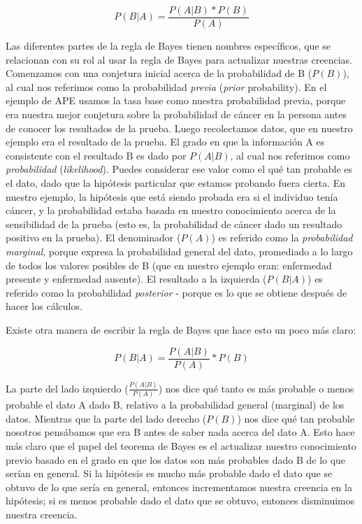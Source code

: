 \documentclass[
  12pt,
]{book}
\begin{document}
\[
P(B|A) =  \frac{P(A|B)*P(B)}{P(A)}
\]

Las diferentes partes de la regla de Bayes tienen nombres específicos, que se relacionan con su rol al usar la regla de Bayes para actualizar nuestras creencias. Comenzamos con una conjetura inicial acerca de la probabilidad de B (\(P(B)\)), al cual nos referimos como la probabilidad \emph{previa} (\emph{prior} probability). En el ejemplo de APE usamos la tasa base como nuestra probabilidad previa, porque era nuestra mejor conjetura sobre la probabilidad de cáncer en la persona antes de conocer los resultados de la prueba. Luego recolectamos datos, que en nuestro ejemplo era el resultado de la prueba. El grado en que la información A es consistente con el resultado B es dado por \(P(A|B)\), al cual nos referimos como \emph{probabilidad} (\emph{likelihood}). Puedes considerar ese valor como el qué tan probable es el dato, dado que la hipótesis particular que estamos probando fuera cierta. En nuestro ejemplo, la hipótesis que está siendo probada era si el individuo tenía cáncer, y la probabilidad estaba basada en nuestro conocimiento acerca de la sensibilidad de la prueba (esto es, la probabilidad de cáncer dado un resultado positivo en la prueba). El denominador (\(P(A)\)) es referido como la \emph{probabilidad marginal}, porque expresa la probabilidad general del dato, promediado a lo largo de todos los valores posibles de B (que en nuestro ejemplo eran: enfermedad presente y enfermedad ausente).
El resultado a la izquierda (\(P(B|A)\)) es referido como la probabilidad \emph{posterior} - porque es lo que se obtiene después de hacer los cálculos.

Existe otra manera de escribir la regla de Bayes que hace esto un poco más claro:

\[
P(B|A) = \frac{P(A|B)}{P(A)}*P(B)
\]

La parte del lado izquierdo (\(\frac{P(A|B)}{P(A)}\)) nos dice qué tanto es más probable o menos probable el dato A dado B, relativo a la probabilidad general (marginal) de los datos. Mientras que la parte del lado derecho (\(P(B)\)) nos dice qué tan probable nosotros pensábamos que era B antes de saber nada acerca del dato A. Esto hace más claro que el papel del teorema de Bayes es el actualizar nuestro conocimiento previo basado en el grado en que los datos son más probables dado B de lo que serían en general. Si la hipótesis es mucho más probable dado el dato que se obtuvo de lo que sería en general, entonces incrementamos nuestra creencia en la hipótesis; si es menos probable dado el dato que se obtuvo, entonces disminuimos nuestra creencia.
\end{document}
